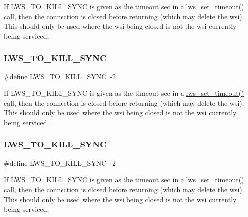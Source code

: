 If L\+W\+S\+\_\+\+T\+O\+\_\+\+K\+I\+L\+L\+\_\+\+S\+Y\+NC is given as the timeout sec in a \hyperlink{group__timeout_gaced9f9237f6172fed9f730a2af51345a}{lws\+\_\+set\+\_\+timeout()} call, then the connection is closed before returning (which may delete the wsi). This should only be used where the wsi being closed is not the wsi currently being serviced. \mbox{\label{group__timeout_ga3cef438d5bbd20a33afbec8e29a0b9a6}} 
\subsubsection{\texorpdfstring{L\+W\+S\+\_\+\+T\+O\+\_\+\+K\+I\+L\+L\+\_\+\+S\+Y\+NC}{LWS\_TO\_KILL\_SYNC}\hspace{0.1cm}{\footnotesize\ttfamily [5/6]}}
{\footnotesize\ttfamily \#define L\+W\+S\+\_\+\+T\+O\+\_\+\+K\+I\+L\+L\+\_\+\+S\+Y\+NC~-\/2}

If L\+W\+S\+\_\+\+T\+O\+\_\+\+K\+I\+L\+L\+\_\+\+S\+Y\+NC is given as the timeout sec in a \hyperlink{group__timeout_gaced9f9237f6172fed9f730a2af51345a}{lws\+\_\+set\+\_\+timeout()} call, then the connection is closed before returning (which may delete the wsi). This should only be used where the wsi being closed is not the wsi currently being serviced. \mbox{\label{group__timeout_ga3cef438d5bbd20a33afbec8e29a0b9a6}} 
\subsubsection{\texorpdfstring{L\+W\+S\+\_\+\+T\+O\+\_\+\+K\+I\+L\+L\+\_\+\+S\+Y\+NC}{LWS\_TO\_KILL\_SYNC}\hspace{0.1cm}{\footnotesize\ttfamily [6/6]}}
{\footnotesize\ttfamily \#define L\+W\+S\+\_\+\+T\+O\+\_\+\+K\+I\+L\+L\+\_\+\+S\+Y\+NC~-\/2}

If L\+W\+S\+\_\+\+T\+O\+\_\+\+K\+I\+L\+L\+\_\+\+S\+Y\+NC is given as the timeout sec in a \hyperlink{group__timeout_gaced9f9237f6172fed9f730a2af51345a}{lws\+\_\+set\+\_\+timeout()} call, then the connection is closed before returning (which may delete the wsi). This should only be used where the wsi being closed is not the wsi currently being serviced. 

